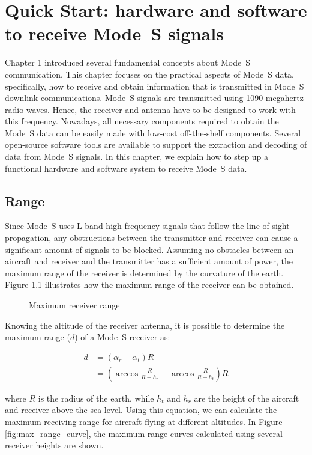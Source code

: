 \chapter{Quick Start: hardware and software to receive Mode~S signals}
\label{chap:quickstart}

Chapter 1 introduced several fundamental concepts about Mode~S communication. This chapter focuses on the practical aspects of Mode~S data, specifically, how to receive and obtain information that is transmitted in Mode~S downlink communications. Mode~S signals are transmitted using 1090 megahertz radio waves. Hence, the receiver and antenna have to be designed to work with this frequency. Nowadays, all necessary components required to obtain the Mode~S data can be easily made with low-cost off-the-shelf components. Several open-source software tools are available to support the extraction and decoding of data from Mode~S signals. In this chapter, we explain how to step up a functional hardware and software system to receive Mode~S data.

\section{Range}
Since Mode~S uses L band high-frequency signals that follow the line-of-sight propagation, any obstructions between the transmitter and receiver can cause a significant amount of signals to be blocked. Assuming no obstacles between an aircraft and receiver and the transmitter has a sufficient amount of power, the maximum range of the receiver is determined by the curvature of the earth. Figure \ref{fig:max_range} illustrates how the maximum range of the receiver can be obtained.

\begin{figure}[ht]
  \centering
  
  \caption{Maximum receiver range}
  \label{fig:max_range}
\end{figure}


Knowing the altitude of the receiver antenna, it is possible to determine the maximum range ($d$) of a Mode~S receiver as:

\begin{align}
  d &= (\alpha_r + \alpha_t) R \\
  & = \left( \arccos \frac{R}{R+h_r} + \arccos \frac{R}{R+h_t} \right) R
\end{align}

\noindent where $R$ is the radius of the earth, while $h_t$ and $h_r$ are the height of the aircraft and receiver above the sea level. Using this equation, we can calculate the maximum receiving range for aircraft flying at different altitudes. In Figure \ref{fig:max_range_curve}, the maximum range curves calculated using several receiver heights are shown.

